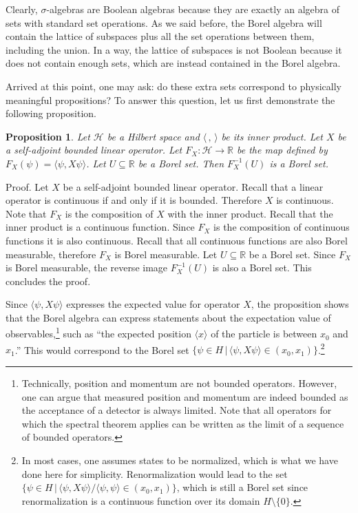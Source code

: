 \documentclass[11pt, executivepaper]{article}
\newtheorem{prop}{Proposition}
\begin{document}
Clearly, $\sigma$-algebras are Boolean algebras because they are exactly an algebra of sets with standard set operations. As we said before, the Borel algebra will contain the lattice of subspaces plus all the set operations between them, including the union. In a way, the lattice of subspaces is not Boolean because it does not contain enough sets, which are instead contained in the Borel algebra.

Arrived at this point, one may ask: do these extra sets correspond to physically meaningful propositions? To answer this question, let us first demonstrate the following proposition.

\begin{prop}
	Let $\mathcal{H}$ be a Hilbert space and $\langle \, , \, \rangle$ be its inner product. Let $X$ be a self-adjoint bounded linear operator. Let $F_X : \mathcal{H} \to \mathbb{R}$ be the map defined by $F_X(\psi) = \langle \psi , X \psi \rangle$. Let $U \subseteq \mathbb{R}$ be a Borel set. Then $F_X^{-1}(U)$ is a Borel set.
\end{prop}

Proof. Let $X$ be a self-adjoint bounded linear operator. Recall that a linear operator is continuous if and only if it is bounded. Therefore $X$ is continuous. Note that $F_X$ is the composition of $X$ with the inner product. Recall that the inner product is a continuous function. Since $F_X$ is the composition of continuous functions it is also continuous. Recall that all continuous functions are also Borel measurable, therefore $F_X$ is Borel measurable. Let $U \subseteq \mathbb{R}$ be a Borel set. Since $F_X$ is Borel measurable, the reverse image $F_X^{-1}(U)$ is also a Borel set. This concludes the proof.

Since $\langle \psi , X \psi \rangle$ expresses the expected value for operator $X$, the proposition shows that the Borel algebra can express statements about the expectation value of observables,\footnote{Technically, position and momentum are not bounded operators. However, one can argue that measured position and momentum are indeed bounded as the acceptance of a detector is always limited. Note that all operators for which the spectral theorem applies can be written as the limit of a sequence of bounded operators.} such as ``the expected position $\langle x \rangle$ of the particle is between $x_0$ and $x_1$.'' This would correspond to the Borel set $\{ \psi \in H \, | \, \langle \psi , X \psi \rangle \in (x_0, x_1) \}$.\footnote{In most cases, one assumes states to be normalized, which is what we have done here for simplicity. Renormalization would lead to the set $\{ \psi \in H \, | \, \langle \psi , X \psi \rangle / \langle \psi , \psi \rangle \in (x_0, x_1) \}$, which is still a Borel set since renormalization is a continuous function over its domain $H \setminus \{ 0 \}$.}
\end{document}
